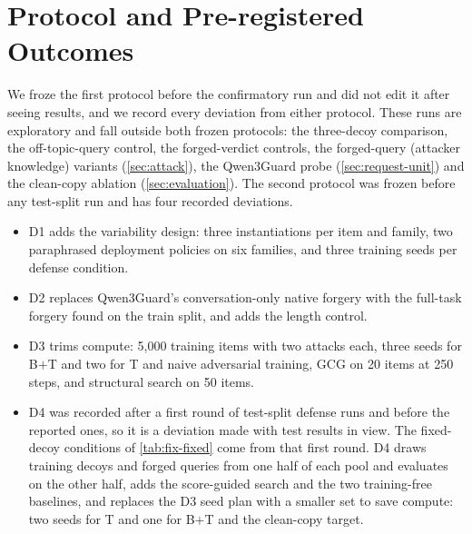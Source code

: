 \section{Protocol and Pre-registered Outcomes}
\label{app:protocol}

We froze the first protocol before the confirmatory run and did not edit it after seeing results, and we record every deviation from either protocol. %
These runs are exploratory and fall outside both frozen protocols: the three-decoy comparison, the off-topic-query control, the forged-verdict controls, the forged-query (attacker knowledge) variants (\cref{sec:attack}), the Qwen3Guard probe (\cref{sec:request-unit}) and the clean-copy ablation (\cref{sec:evaluation}).
The second protocol was frozen before any test-split run and has four recorded deviations. %
\begin{itemize}[leftmargin=1.5em,itemsep=1pt]
  \item D1 adds the variability design: three instantiations per item and family, two paraphrased deployment policies on six families, and three training seeds per defense condition.
  \item D2 replaces Qwen3Guard's conversation-only native forgery with the full-task forgery found on the train split, and adds the length control.
  \item D3 trims compute: 5{,}000 training items with two attacks each, three seeds for B$+$T and two for T and naive adversarial training, GCG on 20 items at 250 steps, and structural search on 50 items.
  \item D4 was recorded after a first round of test-split defense runs and before the reported ones, so it is a deviation made with test results in view. The fixed-decoy conditions of \cref{tab:fix-fixed} come from that first round. D4 draws training decoys and forged queries from one half of each pool and evaluates on the other half, adds the score-guided search and the two training-free baselines, and replaces the D3 seed plan with a smaller set to save compute: two seeds for T and one for B$+$T and the clean-copy target. %
\end{itemize}

